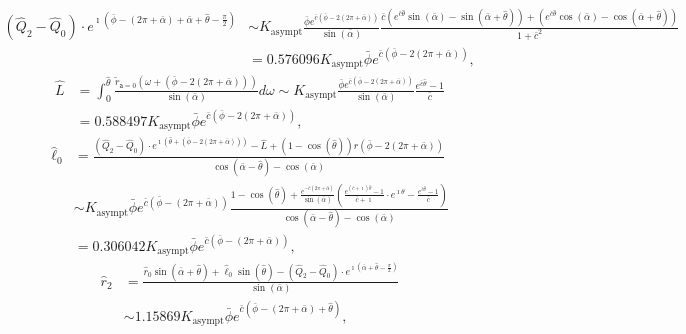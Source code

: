 \documentclass[reqno]{amsart}
\theoremstyle{definition} \newtheorem{definition}{Definition}[section]
\theoremstyle{definition} \newtheorem{remark}[definition]{Remark}
\theoremstyle{plain} \newtheorem{lemma}[definition]{Lemma}
\theoremstyle{plain} \newtheorem{proposition}[definition]{Proposition}
\theoremstyle{plain} \newtheorem{theorem}[definition]{Theorem}
\theoremstyle{plain} \newtheorem{corollary}[definition]{Corollary}
\theoremstyle{definition} \newtheorem{example}[definition]{Example}
\theoremstyle{plain} \newtheorem{claim}[clai]{Claim}
\theoremstyle{definition} \newtheorem{assumption}[definition]{Assumption}
\theoremstyle{definition} \newtheorem{observation}[definition]{Observation}
\newcommand{\1}{\mathbbm 1}
\renewcommand{\i}{\imath}
\numberwithin{equation}{section} %
\theoremstyle{plain} \newtheorem*{theorem*}{Theorem}
\theoremstyle{plain} \newtheorem{mthm}[maintheorem]{Main Theorem}
\theoremstyle{plain} \newtheorem*{mthm*}{Main Theorem}
\theoremstyle{plain} \newtheorem*{conjecture*}{Conjecture}
\theoremstyle{plain} \newtheorem{conjecture}[definition]{Conjecture}
\theoremstyle{plain} \newtheorem*{problem*}{Problem}
\begin{document}
\begin{align*}
(\hat Q_2 - \hat Q_0) \cdot e^{\i (\bar \phi - (2\pi + \bar \alpha) + \bar \alpha + \hat \theta - \frac{\pi}{2})} &\sim K_\mathrm{asympt} \frac{\bar \phi e^{\bar c (\bar \phi - 2(2\pi + \bar \alpha))}}{\sin(\bar \alpha)} \frac{\bar c (e^{\bar c \hat \theta} \sin(\bar \alpha) - \sin(\bar \alpha + \hat \theta)) + (e^{\bar c \hat \theta} \cos(\bar \alpha) - \cos(\bar \alpha + \hat \theta))}{1 + \bar c^2} \\
&= 0.576096 K_\mathrm{asympt} \bar \phi e^{\bar c (\bar \phi - 2(2\pi + \bar \alpha))},
\end{align*}
\begin{align*}
\hat L &= \int_0^{\hat \theta} \frac{\tilde r_{\mathtt a = 0}(\omega + (\bar \phi - 2(2\pi + \bar \alpha)))}{\sin(\bar \alpha)} d\omega \sim K_\mathrm{asympt} \frac{\bar \phi e^{\bar c (\bar \phi - 2(2\pi + \bar \alpha))}}{\sin(\bar \alpha)} \frac{e^{\bar c \hat \theta} - 1}{\bar c} \\
&= 0.588497 K_\mathrm{asympt} \bar \phi e^{\bar c (\bar \phi - 2(2\pi + \bar \alpha))},
\end{align*}
\begin{align*}
\hat \ell_0 &= \frac{(\hat Q_2 - \hat Q_0) \cdot e^{\i (\hat \theta + (\bar \phi - 2(2\pi + \bar \alpha)))} - \hat L + (1 - \cos(\hat \theta)) r(\bar \phi - 2(2\pi + \bar \alpha))}{\cos(\bar \alpha - \hat \theta) - \cos(\bar \alpha)} \\
&\sim K_\mathrm{asympt} \bar \phi e^{\bar c (\bar \phi - (2\pi + \bar \alpha))} \frac{1 - \cos(\hat \theta) + \frac{e^{-\bar c(2\pi + \bar \alpha)}}{\sin(\bar \alpha)} (\frac{e^{(\bar c + \i) \hat \theta} - 1}{\bar c + \i} \cdot e^{\i \theta} - \frac{e^{\bar c \hat \theta} - 1}{\bar c})}{\cos(\bar \alpha - \hat \theta) - \cos(\bar \alpha)} \\
&= 0.306042 K_\mathrm{asympt} \bar \phi e^{\bar c (\bar \phi - (2\pi + \bar \alpha))},
\end{align*}
\begin{align*}
\hat r_2 &= \frac{\hat r_0 \sin(\bar \alpha + \hat \theta) + \hat \ell_0 \sin(\hat \theta) - (\hat Q_2 - \hat Q_0) \cdot e^{\i (\bar \alpha + \hat \theta - \frac{\pi}{2})}}{\sin(\bar \alpha)} \\
&\sim 1.15869 K_\mathrm{asympt} \bar \phi e^{\bar c (\bar \phi - (2\pi + \bar \alpha) + \hat \theta)},
\end{align*}
\end{document}
